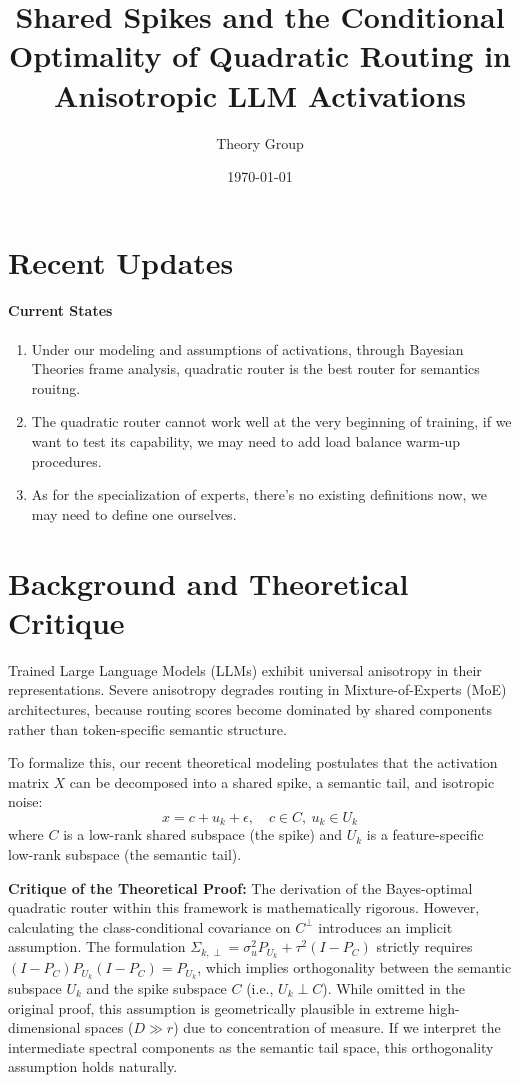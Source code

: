 \documentclass[11pt]{article}
\title{Shared Spikes and the Conditional Optimality of Quadratic Routing in Anisotropic LLM Activations}
\author{Theory Group}
\date{\today}
\begin{document}
\maketitle

% 

\section{Recent Updates}

\paragraph{Current States}
\begin{enumerate}
    \item Under our modeling and assumptions of activations, through Bayesian Theories frame analysis, quadratic router is the best router for semantics rouitng.
    \item The quadratic router cannot work well at the very beginning of training, if we want to test its capability, we may need to add load balance warm-up procedures.
    \item  As for the specialization of experts, there's no existing definitions now, we may need to define one ourselves.
\end{enumerate}

\section{Background and Theoretical Critique}

Trained Large Language Models (LLMs) exhibit universal anisotropy in their representations. Severe anisotropy degrades routing in Mixture-of-Experts (MoE) architectures, because routing scores become dominated by shared components rather than token-specific semantic structure. 

To formalize this, our recent theoretical modeling postulates that the activation matrix $X$ can be decomposed into a shared spike, a semantic tail, and isotropic noise:
\begin{equation}
    x = c + u_k + \epsilon, \quad c \in C, \ u_k \in U_k
\end{equation}
where $C$ is a low-rank shared subspace (the spike) and $U_k$ is a feature-specific low-rank subspace (the semantic tail). 

\textbf{Critique of the Theoretical Proof:} The derivation of the Bayes-optimal quadratic router within this framework is mathematically rigorous. However, calculating the class-conditional covariance on $C^\perp$ introduces an implicit assumption. The formulation $\Sigma_{k,\perp} = \sigma_u^2 P_{U_k} + \tau^2(I - P_C)$ strictly requires $(I - P_C)P_{U_k}(I - P_C) = P_{U_k}$, which implies orthogonality between the semantic subspace $U_k$ and the spike subspace $C$ (i.e., $U_k \perp C$). While omitted in the original proof, this assumption is geometrically plausible in extreme high-dimensional spaces ($D \gg r$) due to concentration of measure. If we interpret the intermediate spectral components as the semantic tail space, this orthogonality assumption holds naturally.
\end{document}
